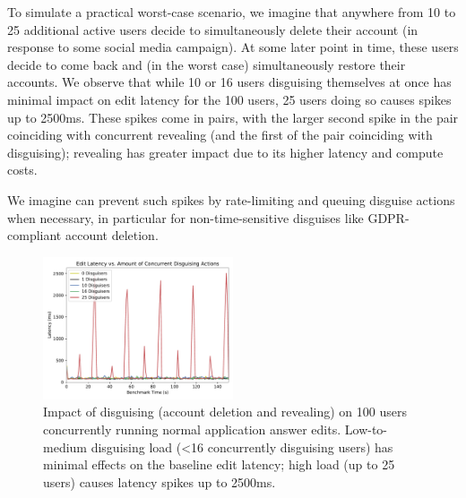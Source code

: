 To simulate a practical worst-case scenario, we imagine that anywhere from 10 to 25 additional
active users decide to simultaneously delete their account (\eg in response to some social media
campaign). At some later point in time, these users decide to come back and (in the worst case)
simultaneously restore their accounts. We observe that while 10 or 16 users disguising themselves at once
has minimal impact on edit latency for the 100 users, 25 users doing so causes spikes up to 2500ms.  
%
These spikes come in pairs, with the larger second spike in the pair coinciding with concurrent
revealing (and the first of the pair coinciding with disguising); revealing has greater impact due
to its higher latency and compute costs.

We imagine \sys can prevent such spikes by rate-limiting and queuing disguise actions when
necessary, in particular for non-time-sensitive disguises like GDPR-compliant account deletion.


\begin{figure}[t!]
    \centering
        \includegraphics[width=0.5\textwidth]{figs/concurrent_results_20lec_100users}
    \caption{Impact of disguising (account deletion and revealing) on 100 users concurrently running
    normal application answer edits. Low-to-medium disguising load (<16 concurrently disguising users) has
    minimal effects on the baseline edit latency; high load (up to 25 users) causes latency spikes
    up to 2500ms.} 
    \label{fig:concurrent}
\end{figure}
